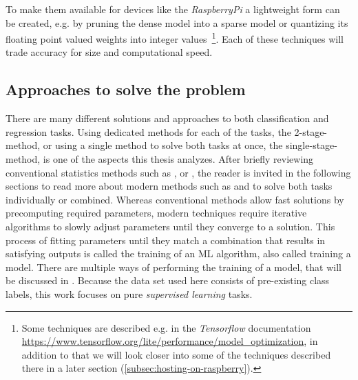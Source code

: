 To make them available for devices like the \textit{RaspberryPi} a lightweight form can be created, e.g. by pruning the dense model into a sparse model or quantizing its floating point valued weights into integer values~\footnote{Some techniques are described e.g. in the \textit{Tensorflow} documentation \leavevmode\url{https://www.tensorflow.org/lite/performance/model_optimization}, in addition to that we will look closer into some of the techniques described there in a later section (\leavevmode\ref{subsec:hosting-on-raspberry}).}.
Each of these techniques will trade accuracy for size and computational speed.


\subsection{Approaches to solve the problem}\label{subsec:approaches-to-solve-the-problem}
There are many different solutions and approaches to both classification and regression tasks.
Using dedicated methods for each of the tasks, the 2-stage-method, or using a single method to solve both tasks at once, the single-stage-method, is one of the aspects this thesis analyzes.
After briefly reviewing conventional statistics methods such as , or ,
the reader is invited in the following sections to read more about modern methods such as  and  to solve both tasks individually or combined.
Whereas conventional methods allow fast solutions by precomputing required parameters, modern techniques require iterative algorithms to slowly adjust parameters until they converge to a solution.
This process of fitting parameters until they match a combination that results in satisfying outputs is called the training of an ML algorithm, also called training a model.
There are multiple ways of performing the training of a model, that will be discussed in .
Because the data set used here consists of pre-existing class labels, this work focuses on pure \textit{supervised learning} tasks.

